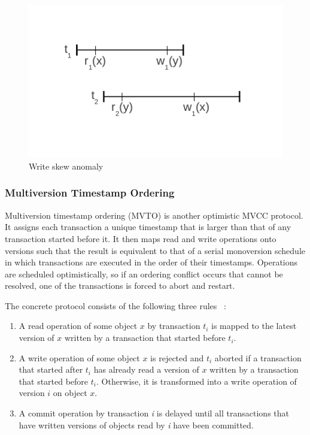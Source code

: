 \documentclass[10pt,final,journal]{IEEEtran}
\begin{document}
\begin{figure}[!t]
\centering
\hspace*{-.2in}
\includegraphics{images/si.pdf}
\caption{Write skew anomaly}
\label{si}
\end{figure}

\subsubsection{Multiversion Timestamp Ordering}
Multiversion timestamp ordering (MVTO) is another optimistic MVCC protocol. It assigns each transaction a unique timestamp that is larger than that of any transaction started before it. It then maps read and write operations onto versions such that the result is equivalent to that of a serial monoversion schedule in which transactions are executed in the order of their timestamps. Operations are scheduled optimistically, so if an ordering conflict occurs that cannot be resolved, one of the transactions is forced to abort and restart.

The concrete protocol consists of the following three rules ~\cite{Weikum:2001:TIS}:
\begin{enumerate}
\item A read operation of some object $x$ by transaction $t_i$ is mapped to the latest version of $x$ written by a transaction that started before $t_i$.
\item A write operation of some object $x$ is rejected and $t_i$ aborted if a transaction that started after $t_i$ has already read a version of $x$ written by a transaction that started before $t_i$. Otherwise, it is transformed into a write operation of version $i$ on object $x$.
\item A commit operation by transaction \emph{i} is delayed until all transactions that have written versions of objects read by \emph{i} have been committed.
\end{enumerate}
\end{document}
